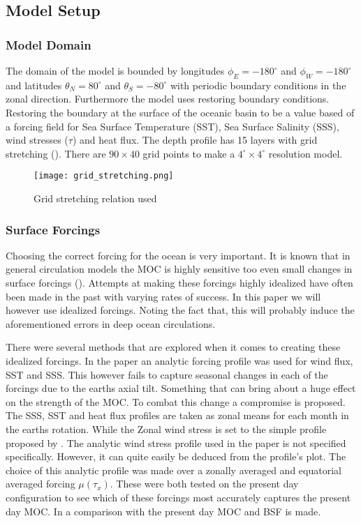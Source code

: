 
\subsection{Model Setup}
\subsubsection{Model Domain}
The domain of the model is bounded by longitudes $\phi_E=-180^{\circ}$ and $\phi_W=-180^{\circ}$ and latitudes $\theta_N=80^{\circ}$ and $\theta_S=-80^{\circ}$ with periodic boundary conditions in the zonal direction.
Furthermore the model uses restoring boundary conditions. Restoring the boundary at the surface of the oceanic basin to be a value based of a forcing field for Sea Surface Temperature (SST), Sea Surface Salinity (SSS), wind stresses ($\tau$) and heat flux.
 The depth profile has 15 layers with grid stretching (). There are $90 \times 40$ grid points to make a $4^{\circ} \times 4^{\circ}$ resolution model.
 
 \begin{figure}[H]
 	\texttt{[image: grid\_stretching.png]}
 	\caption{Grid stretching relation used}
 	\label{fig:gridstrech}
 \end{figure}

\subsubsection{Surface Forcings}
 Choosing the correct forcing for the ocean is very important. It is known that in general circulation models the MOC is highly sensitive too even small changes in surface forcings (\cite{Milliff1999May}). Attempts at making these forcings highly idealized have often been made in the past with varying rates of success. In this paper we will however use idealized forcings. Noting the fact that, this will probably induce the aforementioned errors in deep ocean circulations.
 
 There were several methods that are explored when it comes to creating these idealized forcings. In the \cite{Mulder2017Jul} paper an analytic forcing profile was used for wind flux, SST and SSS. This however fails to capture seasonal changes in each of the forcings due to the earths axial tilt. Something that can bring about a huge effect on the strength of the MOC. To combat this change a compromise is proposed. The SSS, SST and heat flux profiles are taken as zonal means for each month in the earths rotation. While the Zonal wind stress is set to the simple profile proposed by \cite{bryan1987parameter}. The analytic wind stress profile used in the paper is not specified specifically. However, it can quite easily be deduced from the profile's plot. The choice of this analytic profile was made over a zonally averaged and equatorial averaged forcing $\mu(\tau_x)$. These were both tested on the present day configuration to see which of these forcings most accurately captures the present day MOC. In  a comparison with the present day MOC and BSF is made. 
 
